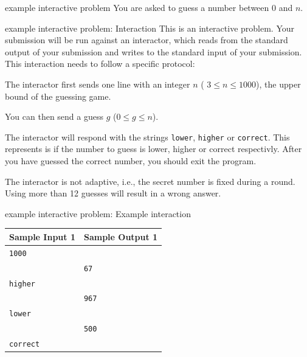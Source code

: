 \documentclass[11pt,pdf, aspectratio=169]{beamer}
\begin{document}
  \begin{frame}{example interactive problem}
    You are asked to guess a number between 0 and $n$.
  \end{frame}
  \begin{frame}{example interactive problem: Interaction}
    This is an interactive problem.
    Your submission will be run against an interactor, which reads from the standard output of your submission and writes to the standard input of your submission.
    This interaction needs to follow a specific protocol:

    The interactor first sends one line with an integer $n$ ( $3 \leq n \leq 1000$), the upper bound of the guessing game.

    You can then send a guess $g$ ($0\leq g \leq n$).

    The interactor will respond with the strings \texttt{lower}, \texttt{higher} or \texttt{correct}.
    This represents is if the number to guess is lower, higher or correct respectivly.
    After you have guessed the correct number, you should exit the program.

    The interactor is not adaptive, i.e., the secret number is fixed during a round.
    Using more than 12 guesses will result in a wrong answer.
  \end{frame}
  \begin{frame}{example interactive problem: Example interaction}
    \begin{tabular}{|l|l|}
      \hline
      \textbf{Sample Input 1} & \textbf{Sample Output 1} \\
      \hline
      \texttt{1000}           &                          \\
      & \texttt{67}              \\
      \texttt{higher}         &                          \\
      & \texttt{967}             \\
      \texttt{lower}          &                          \\
      & \texttt{500}             \\
      \texttt{correct}        &                          \\
      \hline
    \end{tabular}
  \end{frame}
\end{document}
